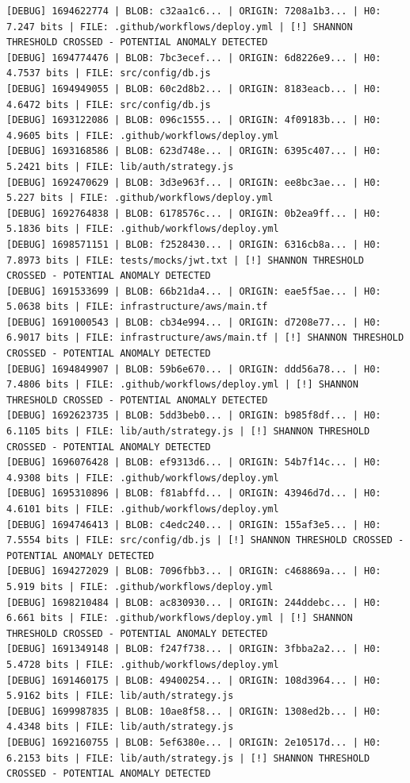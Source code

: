 \documentclass[12pt, a4paper, oneside]{report}
\begin{document}
\begin{lstlisting}[basicstyle=\tiny\ttfamily]
[DEBUG] 1694622774 | BLOB: c32aa1c6... | ORIGIN: 7208a1b3... | H0: 7.247 bits | FILE: .github/workflows/deploy.yml | [!] SHANNON THRESHOLD CROSSED - POTENTIAL ANOMALY DETECTED
[DEBUG] 1694774476 | BLOB: 7bc3ecef... | ORIGIN: 6d8226e9... | H0: 4.7537 bits | FILE: src/config/db.js
[DEBUG] 1694949055 | BLOB: 60c2d8b2... | ORIGIN: 8183eacb... | H0: 4.6472 bits | FILE: src/config/db.js
[DEBUG] 1693122086 | BLOB: 096c1555... | ORIGIN: 4f09183b... | H0: 4.9605 bits | FILE: .github/workflows/deploy.yml
[DEBUG] 1693168586 | BLOB: 623d748e... | ORIGIN: 6395c407... | H0: 5.2421 bits | FILE: lib/auth/strategy.js
[DEBUG] 1692470629 | BLOB: 3d3e963f... | ORIGIN: ee8bc3ae... | H0: 5.227 bits | FILE: .github/workflows/deploy.yml
[DEBUG] 1692764838 | BLOB: 6178576c... | ORIGIN: 0b2ea9ff... | H0: 5.1836 bits | FILE: .github/workflows/deploy.yml
[DEBUG] 1698571151 | BLOB: f2528430... | ORIGIN: 6316cb8a... | H0: 7.8973 bits | FILE: tests/mocks/jwt.txt | [!] SHANNON THRESHOLD CROSSED - POTENTIAL ANOMALY DETECTED
[DEBUG] 1691533699 | BLOB: 66b21da4... | ORIGIN: eae5f5ae... | H0: 5.0638 bits | FILE: infrastructure/aws/main.tf
[DEBUG] 1691000543 | BLOB: cb34e994... | ORIGIN: d7208e77... | H0: 6.9017 bits | FILE: infrastructure/aws/main.tf | [!] SHANNON THRESHOLD CROSSED - POTENTIAL ANOMALY DETECTED
[DEBUG] 1694849907 | BLOB: 59b6e670... | ORIGIN: ddd56a78... | H0: 7.4806 bits | FILE: .github/workflows/deploy.yml | [!] SHANNON THRESHOLD CROSSED - POTENTIAL ANOMALY DETECTED
[DEBUG] 1692623735 | BLOB: 5dd3beb0... | ORIGIN: b985f8df... | H0: 6.1105 bits | FILE: lib/auth/strategy.js | [!] SHANNON THRESHOLD CROSSED - POTENTIAL ANOMALY DETECTED
[DEBUG] 1696076428 | BLOB: ef9313d6... | ORIGIN: 54b7f14c... | H0: 4.9308 bits | FILE: .github/workflows/deploy.yml
[DEBUG] 1695310896 | BLOB: f81abffd... | ORIGIN: 43946d7d... | H0: 4.6101 bits | FILE: .github/workflows/deploy.yml
[DEBUG] 1694746413 | BLOB: c4edc240... | ORIGIN: 155af3e5... | H0: 7.5554 bits | FILE: src/config/db.js | [!] SHANNON THRESHOLD CROSSED - POTENTIAL ANOMALY DETECTED
[DEBUG] 1694272029 | BLOB: 7096fbb3... | ORIGIN: c468869a... | H0: 5.919 bits | FILE: .github/workflows/deploy.yml
[DEBUG] 1698210484 | BLOB: ac830930... | ORIGIN: 244ddebc... | H0: 6.661 bits | FILE: .github/workflows/deploy.yml | [!] SHANNON THRESHOLD CROSSED - POTENTIAL ANOMALY DETECTED
[DEBUG] 1691349148 | BLOB: f247f738... | ORIGIN: 3fbba2a2... | H0: 5.4728 bits | FILE: .github/workflows/deploy.yml
[DEBUG] 1691460175 | BLOB: 49400254... | ORIGIN: 108d3964... | H0: 5.9162 bits | FILE: lib/auth/strategy.js
[DEBUG] 1699987835 | BLOB: 10ae8f58... | ORIGIN: 1308ed2b... | H0: 4.4348 bits | FILE: lib/auth/strategy.js
[DEBUG] 1692160755 | BLOB: 5ef6380e... | ORIGIN: 2e10517d... | H0: 6.2153 bits | FILE: lib/auth/strategy.js | [!] SHANNON THRESHOLD CROSSED - POTENTIAL ANOMALY DETECTED
\end{lstlisting}
\end{document}

